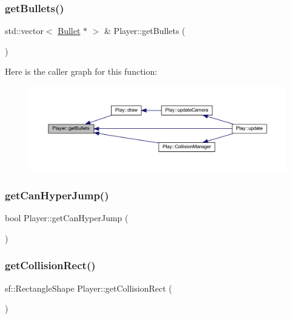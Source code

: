 \subsubsection{\texorpdfstring{get\+Bullets()}{getBullets()}}
{\footnotesize\ttfamily std\+::vector$<$ \hyperlink{class_bullet}{Bullet} $\ast$ $>$ \& Player\+::get\+Bullets (\begin{DoxyParamCaption}{ }\end{DoxyParamCaption})}

Here is the caller graph for this function\+:
\nopagebreak
\begin{figure}[H]
\begin{center}
\leavevmode
\includegraphics[width=350pt]{class_player_a4ad45c4c8298531f45ebed48ce001373_icgraph}
\end{center}
\end{figure}
\mbox{\label{class_player_a6f6ceb55f695ffd573d1e4b999896893}} 
\subsubsection{\texorpdfstring{get\+Can\+Hyper\+Jump()}{getCanHyperJump()}}
{\footnotesize\ttfamily bool Player\+::get\+Can\+Hyper\+Jump (\begin{DoxyParamCaption}{ }\end{DoxyParamCaption})}

\mbox{\label{class_player_ab23a6224f848e8b8fab134c355b8a8de}} 
\subsubsection{\texorpdfstring{get\+Collision\+Rect()}{getCollisionRect()}}
{\footnotesize\ttfamily sf\+::\+Rectangle\+Shape Player\+::get\+Collision\+Rect (\begin{DoxyParamCaption}{ }\end{DoxyParamCaption})}

